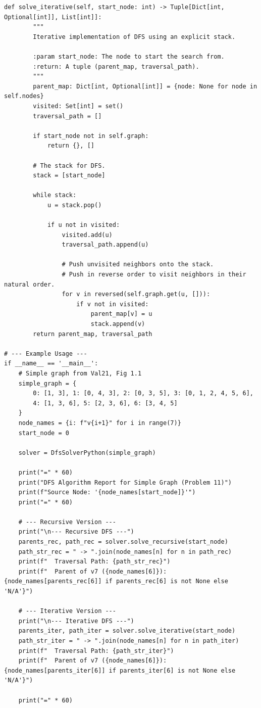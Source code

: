 \documentclass[a4paper,12pt]{article}
\begin{document}
\begin{lstlisting}[style=pythonstyle, caption={Cài đặt DFS cho đơn đồ thị trong Python (cả đệ quy và lặp).}, label={lst:python_dfs_11}]
    def solve_iterative(self, start_node: int) -> Tuple[Dict[int, Optional[int]], List[int]]:
        """
        Iterative implementation of DFS using an explicit stack.

        :param start_node: The node to start the search from.
        :return: A tuple (parent_map, traversal_path).
        """
        parent_map: Dict[int, Optional[int]] = {node: None for node in self.nodes}
        visited: Set[int] = set()
        traversal_path = []
        
        if start_node not in self.graph:
            return {}, []
            
        # The stack for DFS.
        stack = [start_node]

        while stack:
            u = stack.pop()
            
            if u not in visited:
                visited.add(u)
                traversal_path.append(u)

                # Push unvisited neighbors onto the stack.
                # Push in reverse order to visit neighbors in their natural order.
                for v in reversed(self.graph.get(u, [])):
                    if v not in visited:
                        parent_map[v] = u
                        stack.append(v)
        return parent_map, traversal_path

# --- Example Usage ---
if __name__ == '__main__':
    # Simple graph from Val21, Fig 1.1
    simple_graph = {
        0: [1, 3], 1: [0, 4, 3], 2: [0, 3, 5], 3: [0, 1, 2, 4, 5, 6],
        4: [1, 3, 6], 5: [2, 3, 6], 6: [3, 4, 5]
    }
    node_names = {i: f"v{i+1}" for i in range(7)}
    start_node = 0

    solver = DfsSolverPython(simple_graph)
    
    print("=" * 60)
    print("DFS Algorithm Report for Simple Graph (Problem 11)")
    print(f"Source Node: '{node_names[start_node]}'")
    print("=" * 60)
    
    # --- Recursive Version ---
    print("\n--- Recursive DFS ---")
    parents_rec, path_rec = solver.solve_recursive(start_node)
    path_str_rec = " -> ".join(node_names[n] for n in path_rec)
    print(f"  Traversal Path: {path_str_rec}")
    print(f"  Parent of v7 ({node_names[6]}): {node_names[parents_rec[6]] if parents_rec[6] is not None else 'N/A'}")

    # --- Iterative Version ---
    print("\n--- Iterative DFS ---")
    parents_iter, path_iter = solver.solve_iterative(start_node)
    path_str_iter = " -> ".join(node_names[n] for n in path_iter)
    print(f"  Traversal Path: {path_str_iter}")
    print(f"  Parent of v7 ({node_names[6]}): {node_names[parents_iter[6]] if parents_iter[6] is not None else 'N/A'}")
    
    print("=" * 60)
\end{lstlisting}
\end{document}
